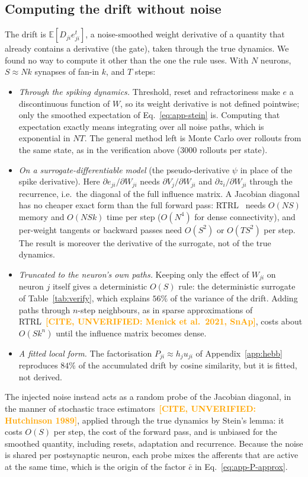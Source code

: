 \documentclass[10pt,twocolumn]{article}
\newcommand{\unverified}[1]{\textcolor{orange}{\bfseries[CITE, UNVERIFIED: #1]}}
\begin{document}
\subsection{Computing the drift without noise}
\label{app:drift-cost}
The drift is $\mathbb{E}[D_{ji}e^t_{ji}]$, a noise-smoothed weight derivative of a
quantity that already contains a derivative (the gate), taken through the true
dynamics. We found no way to compute it other than the one the rule uses. With $N$
neurons, $S\approx Nk$ synapses of fan-in $k$, and $T$ steps:
\begin{itemize}
\item \emph{Through the spiking dynamics.} Threshold, reset and refractoriness make
$e$ a discontinuous function of $W$, so its weight derivative is not defined
pointwise; only the smoothed expectation of Eq.~\eqref{eq:app-stein} is. Computing
that expectation exactly means integrating over all noise paths, which is
exponential in $NT$. The general method left is Monte Carlo over rollouts from the
same state, as in the verification above ($3000$ rollouts per state).
\item \emph{On a surrogate-differentiable model} (the pseudo-derivative $\psi$ in
place of the spike derivative). Here $\partial e_{ji}/\partial W_{ji}$ needs
$\partial V_j/\partial W_{ji}$ and $\partial z_i/\partial W_{ji}$ through the
recurrence, i.e.\ the diagonal of the full influence matrix. A Jacobian diagonal has
no cheaper exact form than the full forward pass: RTRL~\citep{RTRL} needs $O(NS)$
memory and $O(NSk)$ time per step ($O(N^4)$ for dense connectivity), and per-weight
tangents or backward passes need $O(S^2)$ or $O(TS^2)$ per step. The result is
moreover the derivative of the surrogate, not of the true dynamics.
\item \emph{Truncated to the neuron's own paths.} Keeping only the effect of
$W_{ji}$ on neuron $j$ itself gives a deterministic $O(S)$ rule: the deterministic
surrogate of Table~\ref{tab:verify}, which explains $56\%$ of the variance of the
drift. Adding paths through $n$-step neighbours, as in sparse approximations of
RTRL~\unverified{Menick et al.\ 2021, SnAp}, costs about $O(Sk^n)$ until the
influence matrix becomes dense.
\item \emph{A fitted local form.} The factorisation $P_{ji}\approx h_ju_{ji}$ of
Appendix~\ref{app:hebb} reproduces $84\%$ of the accumulated drift by cosine
similarity, but it is fitted, not derived.
\end{itemize}
The injected noise instead acts as a random probe of the Jacobian diagonal, in the
manner of stochastic trace estimators~\unverified{Hutchinson 1989}, applied
through the true dynamics by Stein's lemma: it costs $O(S)$ per step, the cost of
the forward pass, and is unbiased for the smoothed quantity, including resets,
adaptation and recurrence. Because the noise is shared per postsynaptic neuron,
each probe mixes the afferents that are active at the same time, which is the
origin of the factor $\bar c$ in Eq.~\eqref{eq:app-P-approx}.
\end{document}
